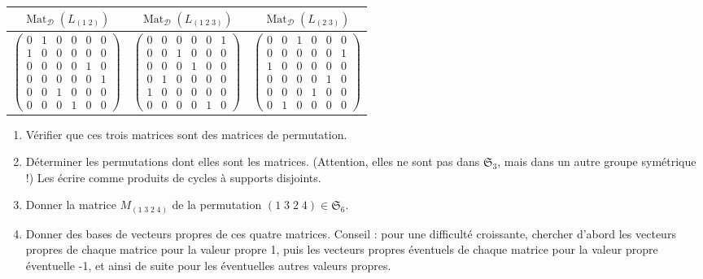 \documentclass[10pt,a4paper,french,landscape]{article}
\theoremstyle{definition}
\theoremstyle{remark}
\DeclareMathOperator{\M}{Mat}
\newcommand{\Sy}{\mathfrak{S}}
\newcommand{\1}{\mathbbm{1}}
\newcommand{\Sn}[1][n]{\Sy_{#1}}
\newcommand{\ba}[1]{\mathcal{#1}}
\begin{document}
\begin{multicols*}{2}
\begin{tabular}{ |c|c|c| }
 \hline
 $\M_\ba{D}(L_{(1\; 2)})$ & $\M_\ba{D}(L_{(1\; 2\; 3)})$ & $\M_\ba{D}(L_{(2\; 3)})$ \\ 
 \hline
 $\begin{pmatrix}
 0 & 1 & 0 & 0 & 0 & 0 \\
 1 & 0 & 0 & 0 & 0 & 0 \\
 0 & 0 & 0 & 0 & 1 & 0 \\
 0 & 0 & 0 & 0 & 0 & 1 \\
 0 & 0 & 1 & 0 & 0 & 0 \\
 0 & 0 & 0 & 1 & 0 & 0
\end{pmatrix}$ & $\begin{pmatrix}
 0 & 0 & 0 & 0 & 0 & 1 \\
 0 & 0 & 1 & 0 & 0 & 0 \\
 0 & 0 & 0 & 1 & 0 & 0 \\
 0 & 1 & 0 & 0 & 0 & 0 \\
 1 & 0 & 0 & 0 & 0 & 0 \\
 0 & 0 & 0 & 0 & 1 & 0
\end{pmatrix}$ & $\begin{pmatrix}
 0 & 0 & 1 & 0 & 0 & 0 \\
 0 & 0 & 0 & 0 & 0 & 1 \\
 1 & 0 & 0 & 0 & 0 & 0 \\
 0 & 0 & 0 & 0 & 1 & 0 \\
 0 & 0 & 0 & 1 & 0 & 0 \\
 0 & 1 & 0 & 0 & 0 & 0
\end{pmatrix}$ \\ 
 \hline
\end{tabular}


\begin{enumerate}
 
\item Vérifier que ces trois matrices sont des matrices de permutation.

\item Déterminer les permutations dont elles sont les matrices. (Attention, elles ne sont pas dans $\Sn[3]$, mais dans un autre groupe symétrique !) Les écrire comme produits de cycles à supports disjoints.

\item Donner la matrice $M_{(1\;3\;2\;4)}$ de la permutation $(1\;3\;2\;4)\in\Sn[6]$.

\item Donner des bases de vecteurs propres de ces quatre matrices. Conseil : pour une difficulté croissante, chercher d'abord les vecteurs propres de chaque matrice pour la valeur propre 1, puis les vecteurs propres éventuels de chaque matrice pour la valeur propre éventuelle -1, et ainsi de suite pour les éventuelles autres valeurs propres.
\end{enumerate}


\end{multicols*}
\end{document}
